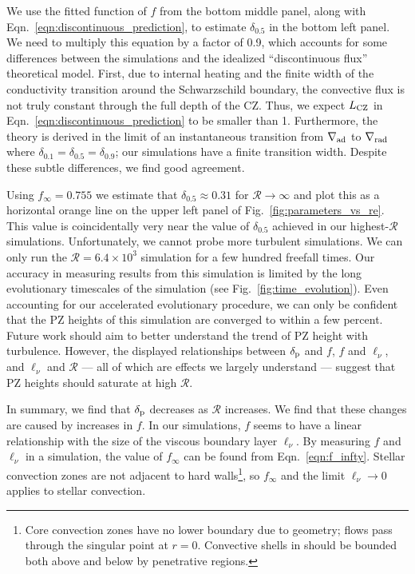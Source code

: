 \documentclass[twocolumn]{aastex631}
\newcommand{\gradrad}{\ensuremath{\nabla_{\rm{rad}}}}
\newcommand{\gradad}{\ensuremath{\nabla_{\rm{ad}}}}
\newcommand{\delp}{\ensuremath{\delta_{\rm{p}}}}
\newcommand{\mR}{\ensuremath{\mathcal{R}}}
\begin{document}
We use the fitted function of $f$ from the bottom middle panel, along with Eqn.~\ref{eqn:discontinuous_prediction}, to estimate $\delta_{0.5}$ in the bottom left panel.
We need to multiply this equation by a factor of 0.9, which accounts for some differences between the simulations and the idealized ``discontinuous flux'' theoretical model.
First, due to internal heating and the finite width of the conductivity transition around the Schwarzschild boundary, the convective flux is not truly constant through the full depth of the CZ.
Thus, we expect $L_{\rm{CZ}}$  in Eqn.~\ref{eqn:discontinuous_prediction} to be smaller than 1.
Furthermore, the theory is derived in the limit of an instantaneous transition from $\gradad$ to $\gradrad$ where $\delta_{0.1} = \delta_{0.5} = \delta_{0.9}$; our simulations have a finite transition width.
Despite these subtle differences, we find good agreement.

Using $f_\infty = 0.755$ we estimate that $\delta_{0.5} \approx 0.31$ for $\mR \rightarrow \infty$ and plot this as a horizontal orange line on the upper left panel of Fig.~\ref{fig:parameters_vs_re}.
This value is coincidentally very near the value of $\delta_{0.5}$ achieved in our highest-$\mR$ simulations.
Unfortunately, we cannot probe more turbulent simulations.
We can only run the $\mR = 6.4 \times 10^{3}$ simulation for a few hundred freefall times.
Our accuracy in measuring results from this simulation is limited by the long evolutionary timescales of the simulation (see Fig.~\ref{fig:time_evolution}).
Even accounting for our accelerated evolutionary procedure, we can only be confident that the PZ heights of this simulation are converged to within a few percent.
Future work should aim to better understand the trend of PZ height with turbulence.
However, the displayed relationships between $\delp$ and $f$, $f$ and $\ell_\nu$, and $\ell_\nu$ and $\mR$ --- all of which are effects we largely understand --- suggest that PZ heights should saturate at high $\mR$.

In summary, we find that $\delp$ decreases as $\mR$ increases.
We find that these changes are caused by increases in $f$.
In our simulations, $f$ seems to have a linear relationship with the size of the viscous boundary layer $\ell_\nu$.
By measuring $f$ and $\ell_\nu$ in a simulation, the value of $f_\infty$ can be found from Eqn.~\ref{eqn:f_infty}.
Stellar convection zones are not adjacent to hard walls\footnote{
Core convection zones have no lower boundary due to geometry; flows pass through the singular point at $r = 0$.
Convective shells in should be bounded both above and below by penetrative regions.
}, so $f_\infty$ and the limit $\ell_\nu \rightarrow 0$ applies to stellar convection.
\end{document}
